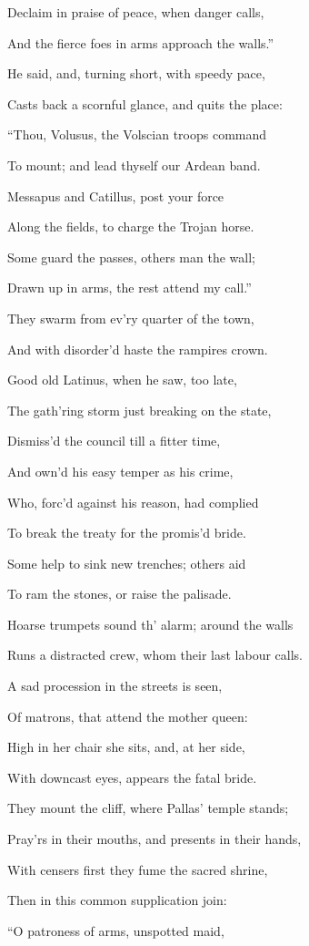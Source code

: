 Declaim in praise of peace, when danger calls,

And the fierce foes in arms approach the walls.”

He said, and, turning short, with speedy pace,

Casts back a scornful glance, and quits the place:

“Thou, Volusus, the Volscian troops command

To mount; and lead thyself our Ardean band.

Messapus and Catillus, post your force

Along the fields, to charge the Trojan horse.

Some guard the passes, others man the wall;

Drawn up in arms, the rest attend my call.”

They swarm from ev’ry quarter of the town,

And with disorder’d haste the rampires crown.

Good old Latinus, when he saw, too late,

The gath’ring storm just breaking on the state,

Dismiss’d the council till a fitter time,

And own’d his easy temper as his crime,

Who, forc’d against his reason, had complied

To break the treaty for the promis’d bride.

Some help to sink new trenches; others aid

To ram the stones, or raise the palisade.

Hoarse trumpets sound th’ alarm; around the walls

Runs a distracted crew, whom their last labour calls.

A sad procession in the streets is seen,

Of matrons, that attend the mother queen:

High in her chair she sits, and, at her side,

With downcast eyes, appears the fatal bride.

They mount the cliff, where Pallas’ temple stands;

Pray’rs in their mouths, and presents in their hands,

With censers first they fume the sacred shrine,

Then in this common supplication join:

“O patroness of arms, unspotted maid,

